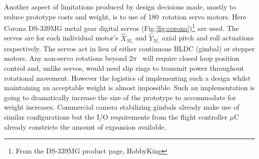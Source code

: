 \par
Another aspect of limitations produced by design decisions made, mostly to reduce prototype costs and weight, is to use of 180\textdegree ~rotation servo motors. Here Corona DS-339MG metal gear digital servos (Fig:\ref{fig:corona})\footnote{From the DS-339MG product page, HobbyKing\cite{hobbyking}} are used. The servos are for each individual motor's $\hat{X}_{M_i}$ and $\hat{Y}_{M_i}$ axial pitch and roll actuations respectively. The servos act in lieu of either continuous BLDC (gimbal) or stepper motors. Any non-servo rotations beyond 2$\pi$ ~will require closed loop position control and, unlike servos, would need slip rings to transmit power throughout rotational movement. However the logistics of implementing such a design whilst maintaining an acceptable weight is almost impossible. Such an implementation is going to dramatically increase the size of the prototype to accommodate for weight increases. Commercial camera stabilizing gimbals already make use of similar configurations but the I/O requirements from the flight controller $\mu$C already constricts the amount of expansion available.
\par
